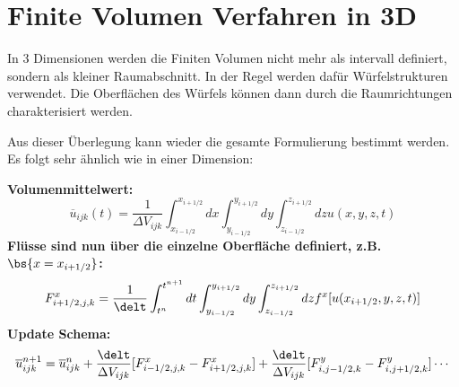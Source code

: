 \section{Finite Volumen Verfahren in 3D}
In 3 Dimensionen werden die Finiten Volumen nicht mehr als intervall definiert, sondern als kleiner Raumabschnitt. In der Regel werden daf\"ur W\"urfelstrukturen verwendet. Die Oberfl\"achen des W\"urfels k\"onnen dann durch die Raumrichtungen charakterisiert werden.
\par
\begin{figure}[ht]
	\centering
\end{figure}
Aus dieser \"Uberlegung kann wieder die gesamte Formulierung bestimmt werden. Es folgt sehr \"ahnlich wie in einer Dimension:
\par
\textbf{Volumenmittelwert:}
\begin{equation*}
	\overline{u}_{ijk}(t) = \frac{1}{\Delta V_{ijk}} \int_{x_{i-1/2}}^{x_{i+1/2}} dx \int_{y_{i-1/2}}^{y_{i+1/2}} dy \int_{z_{i-1/2}}^{z_{i+1/2}} dz u(x,y,z,t)
\end{equation*}
\textbf{Fl\"usse sind nun \"uber die einzelne Oberfl\"ache definiert, z.B. $\bs{x = x_{i+1/2}}$:}
\begin{equation*}
	F^x_{i+1/2,j,k} = \frac{1}{\delt} \int_{t^{n}}^{t^{n+1}} dt \int_{y_{i-1/2}}^{y_{i+1/2}} dy \int_{z_{i-1/2}}^{z_{i+1/2}} dz f^x[u(x_{i+1/2},y,z,t)]
\end{equation*}
\textbf{Update Schema:}
\begin{equation*}
	\overline{u}^{n+1}_{ijk} = \overline{u}^{n}_{ijk} + \frac{\delt}{\Delta V_{ijk}}[F^x_{i-1/2,j,k} - F^x_{i+1/2,j,k}] + \frac{\delt}{\Delta V_{ijk}}[F^y_{i,j-1/2,k} - F^y_{i,j+1/2,k}] \cdots
\end{equation*}


